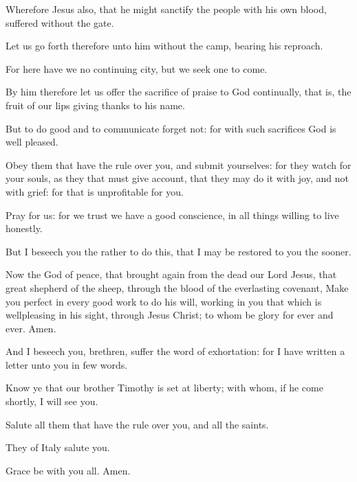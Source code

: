 \verse Wherefore Jesus also, that he might sanctify the people with his own blood, suffered without the gate.

\verse Let us go forth therefore unto him without the camp, bearing his reproach.

\verse For here have we no continuing city, but we seek one to come.

\verse By him therefore let us offer the sacrifice of praise to God continually, that is, the fruit of our lips giving thanks to his name.

\verse But to do good and to communicate forget not: for with such sacrifices God is well pleased.

\verse Obey them that have the rule over you, and submit yourselves: for they watch for your souls, as they that must give account, that they may do it with joy, and not with grief: for that is unprofitable for you.

\verse Pray for us: for we trust we have a good conscience, in all things willing to live honestly.

\verse But I beseech you the rather to do this, that I may be restored to you the sooner.

\verse Now the God of peace, that brought again from the dead our Lord Jesus, that great shepherd of the sheep, through the blood of the everlasting covenant, \verse Make you perfect in every good work to do his will, working in you that which is wellpleasing in his sight, through Jesus Christ; to whom be glory for ever and ever. Amen.

\verse And I beseech you, brethren, suffer the word of exhortation: for I have written a letter unto you in few words.

\verse Know ye that our brother Timothy is set at liberty; with whom, if he come shortly, I will see you.

\verse Salute all them that have the rule over you, and all the saints.

They of Italy salute you.

\verse Grace be with you all. Amen.

